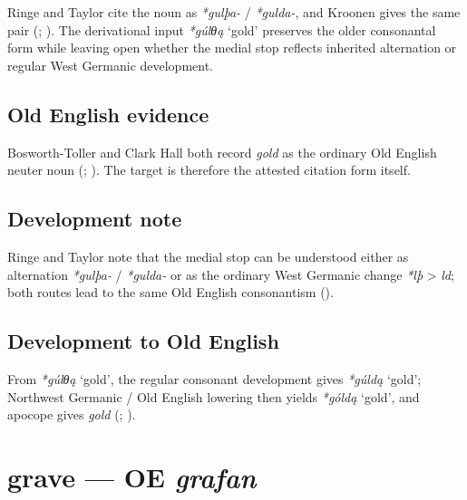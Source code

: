 \documentclass[
  british,
  a4paper,
  openany]{book}
\providecommand{\Recon}[1]{\emph{*#1}}
{\catcode`→=\active \global\def→{\ensuremath{\rightarrow}}}
\providecommand{\texorpdfstring}[2]{#1}
\providecommand{\Recon}[1]{\emph{*#1}}
{\catcode`→=\active \global\def→{\ensuremath{\rightarrow}}}
\begin{document}
Ringe and Taylor cite the noun as \emph{*gulþa-} / \emph{*gulda-}, and
Kroonen gives the same pair (; ). The
derivational input \Recon{gúlθą} `gold' preserves the older consonantal
form while leaving open whether the medial stop reflects inherited
alternation or regular West Germanic development.

\subsection{Old English evidence}\label{old-english-evidence-22}

Bosworth-Toller and Clark Hall both record \emph{gold} as the ordinary
Old English neuter noun (; ).
The target is therefore the attested citation form itself.

\subsection{Development note}\label{development-note-1}

Ringe and Taylor note that the medial stop can be understood either as
alternation \emph{*gulþa-} / \emph{*gulda-} or as the ordinary West
Germanic change \emph{*lþ} \textgreater{} \emph{ld}; both routes lead to
the same Old English consonantism ().

\subsection{Development to Old
English}\label{development-to-old-english-22}

From \Recon{gúlθą} `gold', the regular consonant development gives
\Recon{gúldą} `gold'; Northwest Germanic / Old English lowering then
yields \Recon{góldą} `gold', and apocope gives \emph{gold}
(;
).

\section{\texorpdfstring{grave --- OE
\emph{grafan}}{grave --- OE grafan}}\label{grave-oe-grafan}

\end{document}
